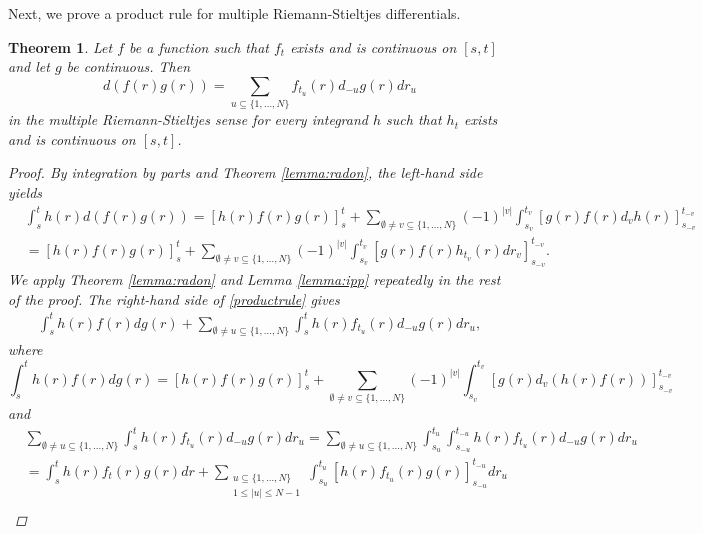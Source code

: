 \documentclass[english, a4paper, 12pt,reqno]{amsart}
\newtheorem{theorem}[defi]{Theorem}
\begin{document}
Next, we prove a product rule for multiple Riemann-Stieltjes differentials.
\begin{theorem}
\label{theorem:productrule}
Let $f$ be a function such that $f_t$ exists and is continuous on $[s,t]$ and let $g$ be continuous.
Then 
\begin{equation}
\label{productrule}
d(f(r)g(r)) = \sum_{u\subseteq \{1,\dots,N\}} f_{t_u}(r) d_{-u}g(r) dr_u
\end{equation}
in the multiple Riemann-Stieltjes sense for every integrand $h$ such that $h_t$ exists and is continuous on $[s,t]$.
\begin{proof}
By integration by parts and Theorem \ref{lemma:radon}, the left-hand side yields
\begin{equation*}
\begin{split}
&\int_s^t h(r) d(f(r)g(r)) = [h(r)f(r)g(r)]_s^t + \sum_{\emptyset\neq v \subseteq \{1,\dots,N\}}(-1)^{|v|} \int_{s_v}^{t_v} [g(r)f(r)d_vh(r)]_{s_{-v}}^{t_{-v}}\\
&= [h(r)f(r)g(r)]_s^t +\sum_{\emptyset\neq v\subseteq \{1,\dots,N\}}(-1)^{|v|} \int_{s_v}^{t_v} [g(r)f(r)h_{t_v}(r)dr_v]_{s_{-v}}^{t_{-v}}.
 \end{split}
\end{equation*}
We apply Theorem \ref{lemma:radon} and Lemma \ref{lemma:ipp} repeatedly in the rest of the proof.
The right-hand side of \eqref{productrule} gives
\begin{equation*}
\begin{split}
\int_s^t h(r)f(r) dg(r) +  \sum_{\emptyset\neq u\subseteq \{1,\dots,N\}}\int_s^t  h(r)f_{t_u}(r) d_{-u}g(r) dr_u,
\end{split}
\end{equation*}
where
\begin{equation*}
\int_s^t h(r)f(r) dg(r) = [h(r)f(r)g(r)]_s^t + \sum_{\emptyset\neq v \subseteq \{1,\dots,N\}}(-1)^{|v|} \int_{s_v}^{t_v} [g(r)d_v(h(r)f(r))]_{s_{-v}}^{t_{-v}}
\end{equation*}
and
\begin{equation*}
\begin{split}
&\sum_{\emptyset\neq u\subseteq \{1,\dots,N\}}\int_s^t  h(r)f_{t_u}(r) d_{-u}g(r) dr_u = \sum_{\emptyset\neq u\subseteq \{1,\dots,N\}}\int_{s_u}^{t_u} \int_{s_{-u}}^{t_{-u}} h(r)f_{t_u}(r) d_{-u}g(r) dr_u \\
&=\int_{s}^{t} h(r)f_t(r)g(r) dr + \sum_{\substack{u\subseteq\{1,\dots,N\}\\
1 \leq |u|\leq N-1}} \int_{s_u}^{t_u} [h(r)f_{t_u}(r)g(r)]_{s_{-u}}^{t_{-u}} dr_u\\

\end{split}
\end{equation*}
\end{proof}
\end{theorem}
\end{document}
